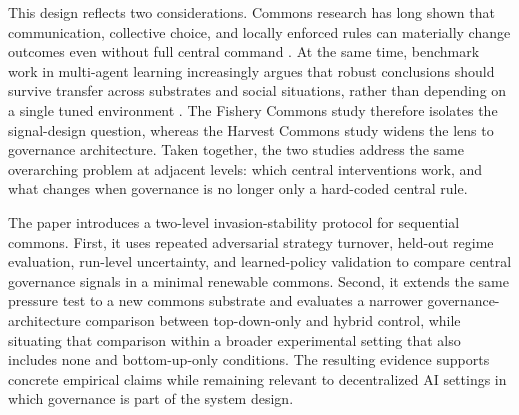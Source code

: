 This design reflects two considerations. Commons research has long shown that communication, collective choice, and locally enforced rules can materially change outcomes even without full central command \citep{ostrom1992covenants,walker2000collective}. At the same time, benchmark work in multi-agent learning increasingly argues that robust conclusions should survive transfer across substrates and social situations, rather than depending on a single tuned environment \citep{meltingpot2021,socialjax2025}. The Fishery Commons study therefore isolates the signal-design question, whereas the Harvest Commons study widens the lens to governance architecture. Taken together, the two studies address the same overarching problem at adjacent levels: which central interventions work, and what changes when governance is no longer only a hard-coded central rule.

The paper introduces a two-level invasion-stability protocol for sequential commons. First, it uses repeated adversarial strategy turnover, held-out regime evaluation, run-level uncertainty, and learned-policy validation to compare central governance signals in a minimal renewable commons. Second, it extends the same pressure test to a new commons substrate and evaluates a narrower governance-architecture comparison between top-down-only and hybrid control, while situating that comparison within a broader experimental setting that also includes none and bottom-up-only conditions. The resulting evidence supports concrete empirical claims while remaining relevant to decentralized AI settings in which governance is part of the system design.
